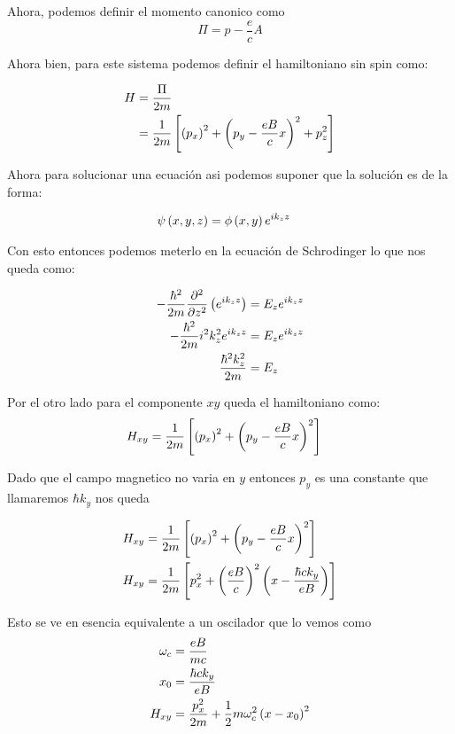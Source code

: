 \documentclass{report}
\begin{document}
Ahora, podemos definir el momento canonico como
\[
  \Pi = p - \frac{e}{c}A
\]

Ahora bien, para este sistema podemos definir el hamiltoniano sin spin como:

\begin{align*}
  H &= \frac{\Pi}{2m}\\
  &= \frac{1}{2m} \left[\left(p_x\right)^2 + \left(p_y - \frac{eB}{c}x\right)^2 + p_z^2\right]
\end{align*}

Ahora para solucionar una ecuación asi podemos suponer que la solución es de la forma:

\begin{align*}
  \psi\left(x, y, z\right) &= \phi\left(x, y\right)e^{ik_zz}
\end{align*}

Con esto entonces podemos meterlo en la ecuación de Schrodinger lo que nos queda como:

\begin{align*}
  -\frac{\hbar^2}{2m}\frac{\partial^2}{\partial z^2} \left(e^{ik_zz}\right) &= E_z e^{ik_zz}\\
  -\frac{\hbar^2}{2m}i^2k_z^2 e^{ik_zz} &= E_z e^{ik_zz}\\
  \frac{\hbar^2k_z^2}{2m} &= E_z
\end{align*}

Por el otro lado para el componente $xy$ queda el hamiltoniano como:
\begin{align*}
  H_{xy} &= \frac{1}{2m} \left[\left(p_x\right)^2 + \left(p_y - \frac{eB}{c}x\right)^2\right]
\end{align*}

Dado que el campo magnetico no varia en $y$ entonces $p_y$ es una constante que llamaremos $\hbar k_y$ nos queda

\begin{align*}
  H_{xy} &= \frac{1}{2m} \left[\left(p_x\right)^2 + \left(p_y - \frac{eB}{c}x\right)^2\right]\\
  H_{xy} &= \frac{1}{2m} \left[p_x^2 + \left(\frac{eB}{c}\right)^2\left(x - \frac{\hbar ck_y}{eB}\right)\right]
\end{align*}

Esto se ve en esencia equivalente a un oscilador que lo vemos como
\begin{align*}
  \omega_c &= \frac{eB}{mc}\\
  x_0 &= \frac{\hbar c k_y}{eB}\\
  H_{xy} &= \frac{p_x^2}{2m} + \frac{1}{2}m\omega_c^2 \left(x - x_0\right)^2
\end{align*}
\end{document}
